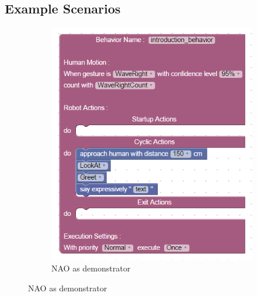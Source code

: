 \documentclass{llncs}
\begin{document}
\subsection{Example Scenarios}
\begin{figure}
\centering
\begin{subfigure}[t]{0.5\textwidth}
\includegraphics[width=\textwidth]{../thesis/assets/scenario1.png}
\caption[NAO as demonstrator]{NAO as demonstrator}
\label{fig:scenario1_program}
\end{subfigure}


\end{figure}
\end{document}
